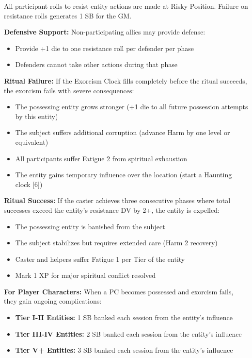 All participant rolls to resist entity actions are made at Risky Position. Failure on resistance rolls generates 1 SB for the GM.

\textbf{Defensive Support:}
Non-participating allies may provide defense:
\begin{itemize}
\item Provide +1 die to one resistance roll per defender per phase
\item Defenders cannot take other actions during that phase
\end{itemize}

\textbf{Ritual Failure:}
If the Exorcism Clock fills completely before the ritual succeeds, the exorcism fails with severe consequences:
\begin{itemize}
\item The possessing entity grows stronger (+1 die to all future possession attempts by this entity)
\item The subject suffers additional corruption (advance Harm by one level or equivalent)
\item All participants suffer Fatigue 2 from spiritual exhaustion
\item The entity gains temporary influence over the location (start a Haunting clock [6])
\end{itemize}

\textbf{Ritual Success:}
If the caster achieves three consecutive phases where total successes exceed the entity's resistance DV by 2+, the entity is expelled:
\begin{itemize}
\item The possessing entity is banished from the subject
\item The subject stabilizes but requires extended care (Harm 2 recovery)
\item Caster and helpers suffer Fatigue 1 per Tier of the entity
\item Mark 1 XP for major spiritual conflict resolved
\end{itemize}

\textbf{For Player Characters:}
When a PC becomes possessed and exorcism fails, they gain ongoing complications:
\begin{itemize}
\item \textbf{Tier I-II Entities:} 1 SB banked each session from the entity's influence
\item \textbf{Tier III-IV Entities:} 2 SB banked each session from the entity's influence
\item \textbf{Tier V+ Entities:} 3 SB banked each session from the entity's influence
\end{itemize}

